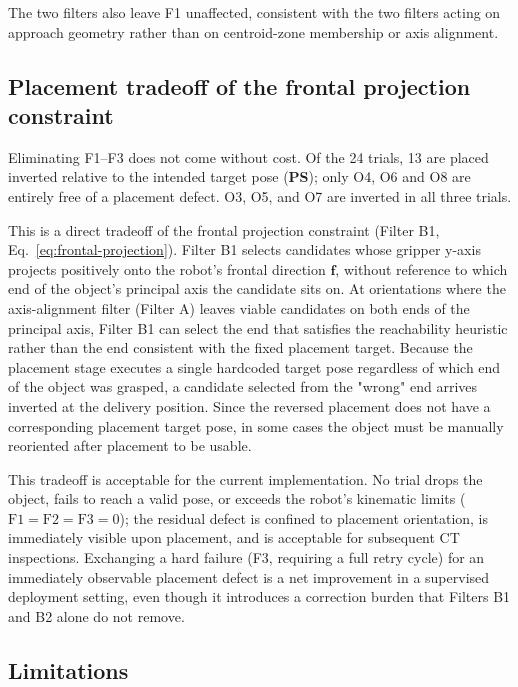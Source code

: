 \documentclass[12pt, a4paper]{report}
\begin{document}
The two filters also leave F1 unaffected, consistent with the two filters acting on approach geometry rather than on centroid-zone membership or axis alignment.

\subsection{Placement tradeoff of the frontal projection constraint}
\label{sec:appendix-ps-tradeoff}

Eliminating F1--F3 does not come without cost. Of the 24 trials, 13 are placed inverted relative to the intended target pose (\textbf{PS}); only O4, O6 and O8 are entirely free of a placement defect. O3, O5, and O7 are inverted in all three trials.

This is a direct tradeoff of the frontal projection constraint (Filter B1, Eq.~\eqref{eq:frontal-projection}). Filter B1 selects candidates whose gripper y-axis projects positively onto the robot's frontal direction $\mathbf{f}$, without reference to which end of the object's principal axis the candidate sits on. At orientations where the axis-alignment filter (Filter A) leaves viable candidates on both ends of the principal axis, Filter B1 can select the end that satisfies the reachability heuristic rather than the end consistent with the fixed placement target. Because the placement stage executes a single hardcoded target pose regardless of which end of the object was grasped, a candidate selected from the "wrong" end arrives inverted at the delivery position. Since the reversed placement does not have a corresponding placement target pose, in some cases the object must be manually reoriented after placement to be usable.

This tradeoff is acceptable for the current implementation. No trial drops the object, fails to reach a valid pose, or exceeds the robot's kinematic limits ($\text{F1} = \text{F2} = \text{F3} = 0$); the residual defect is confined to placement orientation, is immediately visible upon placement, and is acceptable for subsequent CT inspections. Exchanging a hard failure (F3, requiring a full retry cycle) for an immediately observable placement defect is a net improvement in a supervised deployment setting, even though it introduces a correction burden that Filters B1 and B2 alone do not remove.

\subsection{Limitations}
\label{sec:appendix-limitations}
\end{document}
